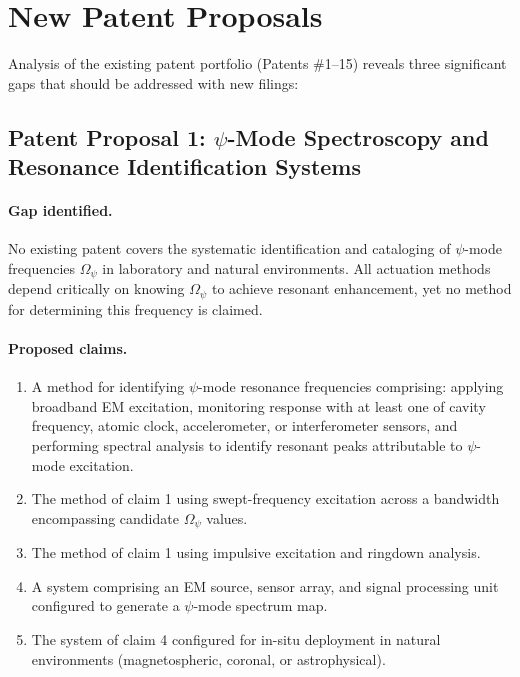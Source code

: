 \documentclass[aps,prd,twocolumn,superscriptaddress,floatfix,nofootinbib]{revtex4-2}
\newcommand{\Opsi}{\Omega_\psi}
\begin{document}
\section{New Patent Proposals}\label{sec:new-patents}

Analysis of the existing patent portfolio (Patents \#1--15) reveals
three significant gaps that should be addressed with new filings:

\subsection{Patent Proposal 1: $\psi$-Mode Spectroscopy and Resonance
Identification Systems}

\paragraph{Gap identified.}
No existing patent covers the systematic identification and cataloging
of $\psi$-mode frequencies $\Opsi$ in laboratory and natural
environments. All actuation methods depend critically on knowing
$\Opsi$ to achieve resonant enhancement, yet no method for determining
this frequency is claimed.

\paragraph{Proposed claims.}
\begin{enumerate}[nosep]
\item A method for identifying $\psi$-mode resonance frequencies
comprising: applying broadband EM excitation, monitoring response
with at least one of cavity frequency, atomic clock, accelerometer,
or interferometer sensors, and performing spectral analysis to
identify resonant peaks attributable to $\psi$-mode excitation.
\item The method of claim 1 using swept-frequency excitation across
a bandwidth encompassing candidate $\Opsi$ values.
\item The method of claim 1 using impulsive excitation and ringdown
analysis.
\item A system comprising an EM source, sensor array, and signal
processing unit configured to generate a $\psi$-mode spectrum map.
\item The system of claim 4 configured for in-situ deployment in
natural environments (magnetospheric, coronal, or astrophysical).
\end{enumerate}
\end{document}
